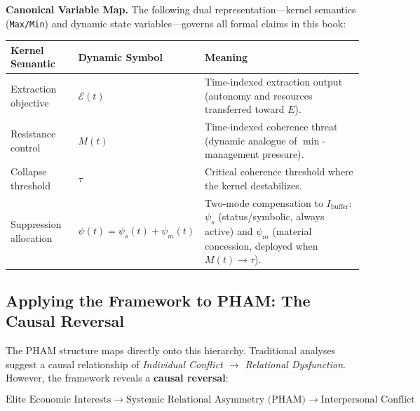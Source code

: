 \documentclass[12pt,openany]{book}
\numberwithin{equation}{chapter}
\begin{document}
\textbf{Canonical Variable Map.} The following dual representation---kernel semantics (\texttt{Max/Min}) and dynamic state variables---governs all formal claims in this book:

\begin{center}
\renewcommand{\arraystretch}{1.35}
\begin{tabular}{>{\raggedright}p{3.3cm} >{\raggedright}p{3.4cm} >{\raggedright\arraybackslash}p{7.4cm}}
\toprule
\textbf{Kernel Semantic} & \textbf{Dynamic Symbol} & \textbf{Meaning} \\
\midrule
Extraction objective & $\mathcal{E}(t)$ & Time-indexed extraction output (autonomy and resources transferred toward $E$). \\
Resistance control & $M(t)$ & Time-indexed coherence threat (dynamic analogue of $\min$-management pressure). \\
Collapse threshold & $\tau$ & Critical coherence threshold where the kernel destabilizes. \\
Suppression allocation & $\psi(t) = \psi_s(t) + \psi_m(t)$ & Two-mode compensation to $I_{\text{buffer}}$: $\psi_s$ (status/symbolic, always active) and $\psi_m$ (material concession, deployed when $M(t) \to \tau$). \\
\bottomrule
\end{tabular}
\end{center}

\subsection{Applying the Framework to PHAM: The Causal Reversal}

The PHAM structure maps directly onto this hierarchy. Traditional analyses suggest a causal relationship of \textit{Individual Conflict $\rightarrow$ Relational Dysfunction}. However, the framework reveals a \textbf{causal reversal}:

\[
\text{Elite Economic Interests} \rightarrow \text{Systemic Relational Asymmetry (PHAM)} \rightarrow \text{Interpersonal Conflict}
\]
\end{document}
